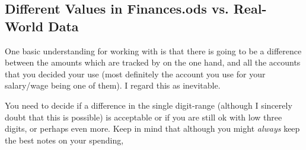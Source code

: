 \subsection{Different Values in Finances.ods vs. Real-World Data}
\label{subsec:different-values-finances.ods-vs-real-world}

One basic understanding for working with \tfn is that there is going to be a difference between the amounts which are tracked by \tfn on the one hand, and all the accounts that you decided your use (most definitely the account you use for your salary/wage being one of them).
I regard this as inevitable.

You need to decide if a difference in the single digit-range (although I sincerely doubt that this is possible) is acceptable or if you are still ok with low three digits, or perhaps even more.
Keep in mind that although you might \emph{always} keep the best notes on your spending, 